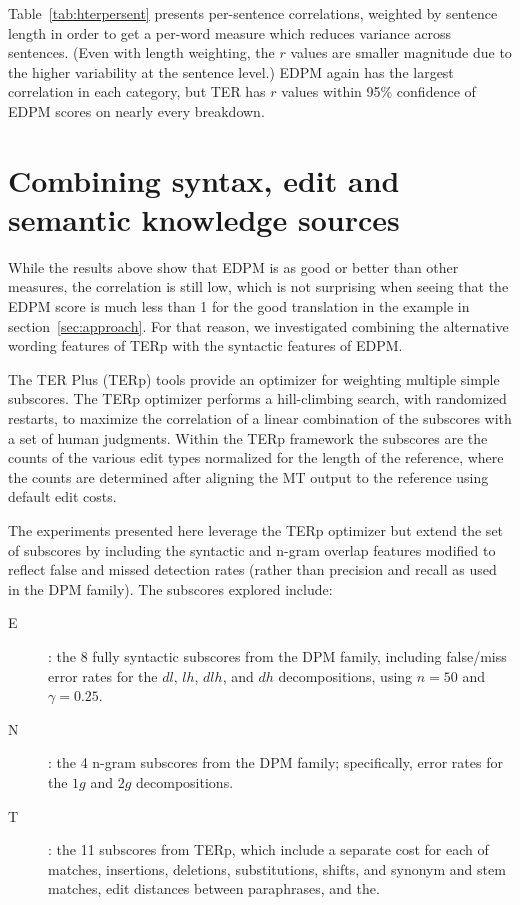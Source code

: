 \documentclass{kluwer}    %
\begin{document}
\begin{article}
Table~\ref{tab:hterpersent} presents per-sentence correlations,
weighted by sentence length in order to get a per-word measure which
reduces variance across sentences.  (Even with length weighting, the
$r$ values are smaller magnitude due to the higher variability at the
sentence level.)  EDPM again has the largest correlation in each
category, but TER has $r$ values within 95\%
confidence of EDPM scores on nearly every breakdown.

\section{Combining syntax, edit and semantic knowledge sources}
\label{sec:hter2}

While the results above show that EDPM is as good or better than other
measures, the correlation is still low, which is not surprising when
seeing that the EDPM score is much less than 1 for the good
translation in the example in section~\ref{sec:approach}. For that
reason, we investigated combining the alternative wording features of
TERp with the syntactic features of EDPM.

The TER Plus (TERp) tools \cite{snover09terp} provide an optimizer for
weighting multiple simple subscores.  The TERp optimizer performs a
hill-climbing search, with randomized restarts, to maximize the
correlation of a linear combination of the subscores with a set of
human judgments.  Within the TERp framework the subscores are the
counts of the various edit types normalized for the length of the
reference, where the counts are determined after aligning the MT
output to the reference using default edit costs.

The experiments presented here leverage the TERp optimizer but extend
the set of subscores by including the syntactic and n-gram overlap
features modified to reflect false and missed detection rates (rather than precision and recall as used in the DPM family). The subscores explored include:
\begin{description}
\item[E]: the 8 fully syntactic subscores from the DPM family, including
  false/miss error rates for the $dl$, $lh$, $dlh$, and $dh$ decompositions,
  using $n=50$ and $\gamma=0.25$. 
\item[N]: the 4 n-gram subscores from the DPM family;
  specifically, error rates for the $1g$ and $2g$ decompositions.
\item[T]: the 11 subscores from TERp, which include a separate cost
  for each of matches, insertions, deletions, substitutions, shifts, and
  synonym and stem matches, edit distances between paraphrases, and the. 
\end{description}


\end{article}
\end{document}
